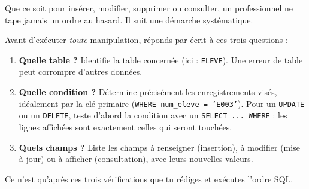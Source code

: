 \documentclass[11pt]{article}
\begin{document}
Que ce soit pour insérer, modifier, supprimer ou consulter, un professionnel ne tape jamais un ordre au hasard. Il suit une démarche systématique.

\begin{methode}
Avant d'exécuter \emph{toute} manipulation, réponds par écrit à ces trois questions :
\begin{enumerate}
\item \textbf{Quelle table ?} Identifie la table concernée (ici : \texttt{ELEVE}). Une erreur de table peut corrompre d'autres données.
\item \textbf{Quelle condition ?} Détermine précisément les enregistrements visés, idéalement par la clé primaire (\texttt{WHERE \texttt{num\_eleve} = 'E003'}). Pour un \texttt{UPDATE} ou un \texttt{DELETE}, teste d'abord la condition avec un \texttt{SELECT ... WHERE} : les lignes affichées sont exactement celles qui seront touchées.
\item \textbf{Quels champs ?} Liste les champs à renseigner (insertion), à modifier (mise à jour) ou à afficher (consultation), avec leurs nouvelles valeurs.
\end{enumerate}
Ce n'est qu'après ces trois vérifications que tu rédiges et exécutes l'ordre SQL.
\end{methode}
\end{document}
